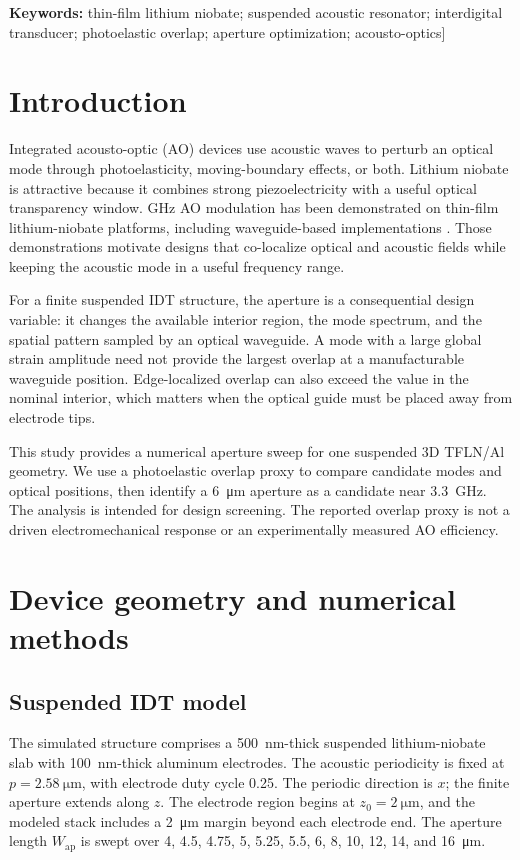 \documentclass[10pt,twocolumn]{article}
\begin{document}
\noindent\textbf{Keywords:} thin-film lithium niobate; suspended acoustic resonator; interdigital transducer; photoelastic overlap; aperture optimization; acousto-optics\vspace{1em}]
\section{Introduction}
Integrated acousto-optic (AO) devices use acoustic waves to perturb an optical mode through photoelasticity, moving-boundary effects, or both. Lithium niobate is attractive because it combines strong piezoelectricity with a useful optical transparency window. GHz AO modulation has been demonstrated on thin-film lithium-niobate platforms, including waveguide-based implementations \cite{Cai2019,Yu2021,Chen2021}. Those demonstrations motivate designs that co-localize optical and acoustic fields while keeping the acoustic mode in a useful frequency range.

For a finite suspended IDT structure, the aperture is a consequential design variable: it changes the available interior region, the mode spectrum, and the spatial pattern sampled by an optical waveguide. A mode with a large global strain amplitude need not provide the largest overlap at a manufacturable waveguide position. Edge-localized overlap can also exceed the value in the nominal interior, which matters when the optical guide must be placed away from electrode tips.

This study provides a numerical aperture sweep for one suspended 3D TFLN/Al geometry. We use a photoelastic overlap proxy to compare candidate modes and optical positions, then identify a \SI{6}{\micro\meter} aperture as a candidate near \SI{3.3}{\giga\hertz}. The analysis is intended for design screening. The reported overlap proxy is not a driven electromechanical response or an experimentally measured AO efficiency.
\section{Device geometry and numerical methods}
\subsection{Suspended IDT model}
The simulated structure comprises a \SI{500}{\nano\meter}-thick suspended lithium-niobate slab with \SI{100}{\nano\meter}-thick aluminum electrodes. The acoustic periodicity is fixed at $p=\SI{2.58}{\micro\meter}$, with electrode duty cycle 0.25. The periodic direction is $x$; the finite aperture extends along $z$. The electrode region begins at $z_0=\SI{2}{\micro\meter}$, and the modeled stack includes a \SI{2}{\micro\meter} margin beyond each electrode end. The aperture length $W_{\mathrm{ap}}$ is swept over 4, 4.5, 4.75, 5, 5.25, 5.5, 6, 8, 10, 12, 14, and \SI{16}{\micro\meter}.
\end{document}
